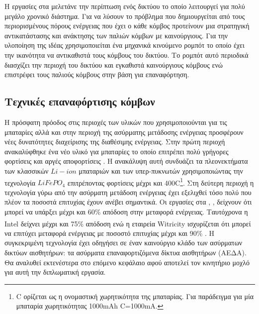 Η εργασίες στα \cite{sens_deployment1} \cite{sens_deployment2} μελετάνε την περίπτωση ενός δικτύου το οποίο λειτουργεί για πολύ μεγάλο χρονικό διάστημα. Για να
λύσουν το πρόβλημα που δημιουργείται από τους περιορισμένους πόρους ενέργειας που έχει ο κάθε κόμβος προτείνουν μια στρατηγική αντικατάστασης και ανάκτησης των παλιών
κόμβων με καινούργιους. Για την υλοποίηση της ιδέας χρησιμοποιείται ένα μηχανικά κινούμενο ρομπότ το οποίο έχει την ικανότητα να αντικαθιστά τους κόμβους του
δικτύου. Το ρομπότ αυτό περιοδικά διασχίζει την περιοχή του δικτύου και εγκαθιστά καινούργιους κόμβους ενώ επιστρέφει τους παλιούς κόμβους στην βάση για επαναφόρτηση.


\subsection{Τεχνικές επαναφόρτισης κόμβων} \label{sc:recharg_tecnhiques}
Η πρόσφατη πρόοδος στις περιοχές των υλικών που χρησιμοποιούνται για τις μπαταρίες αλλά και στην περιοχή της ασύρματης μετάδοσης ενέργειας προσφέρουν νέες δυνατότητες
διαχείρισης της διαθέσιμης ενέργειας. Στην πρώτη περιοχή ανακαλύφθηκε ένα νέο υλικό για μπαταρίες το οποίο επιτρέπει πολύ γρήγορες φορτίσεις και αργές αποφορτίσεις
\cite{fast_recharging}. Η ανακάλυψη αυτή συνδυάζει τα πλεονεκτήματα των κλασσικών $Li-ion$ μπαταριών και των υπερ-πυκνωτών χρησιμοποιώντας την τεχνολογία
$LiFePO_{4}$ επιτρέποντας φορτίσεις μέχρι και 400C\footnote{C ορίζεται ως η ονομαστική χωρητικότητα της μπαταρίας. Για παράδειγμα για μία
μπαταρία χωρητικότητας 1000mAh C=1000mA.}. Στη δεύτερη περιοχή η τεχνολογία γύρω από την ασύρματη μετάδοση ενέργειας έχει εξελιχθεί τόσο πολύ που πλέον τα ποσοστά
επιτυχίας έχουν ανέβει σημαντικά. Οι εργασίες στα \cite{wireless_recharg1}, \cite{wireless_recharg2}, \cite{wireless_recharg3} δείχνουν ότι μπορεί να υπάρξει μέχρι
και 60\% απόδοση στην μεταφορά ενέργειας. Ταυτόχρονα η Intel\textsuperscript{\textregistered} δείχνει μέχρι και 75\% απόδοση \cite{intel_recharg} ενώ η εταιρεία
Witricity\textsuperscript{\textregistered} ισχυρίζεται ότι μπορεί να επιτύχει μεταφορά ενέργειας με ποσοστό επιτυχίας μέχρι και 90\% \cite{witricity_90}. Η
συγκεκριμένη τεχνολογία έχει οδηγήσει σε έναν καινούργιο κλάδο των ασύρματων δικτύων αισθητήρων: τα ασύρματα επαναφορτιζόμενα δίκτυα αισθητήρων (ΑΕΔΑ). Θα αναλυθεί
εκτενέστερα στο επόμενο κεφάλαιο αφού αποτελεί τον κινητήριο μοχλό για αυτή την διπλωματική εργασία.
























